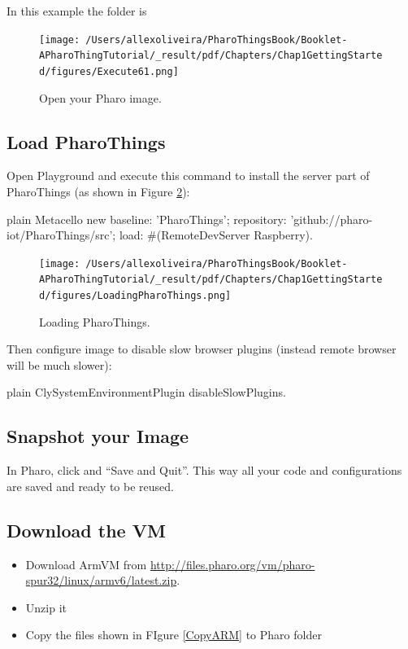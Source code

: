 \documentclass[10pt,twoside,english]{_support/latex/sbabook/sbabook}
\begin{document}
In this example the folder is  


\begin{figure}

\begin{center}
\texttt{[image: /Users/allexoliveira/PharoThingsBook/Booklet-APharoThingTutorial/\_result/pdf/Chapters/Chap1GettingStarted/figures/Execute61.png]}\caption{Open your Pharo image.\label{Execute61}}\end{center}
\end{figure}

\subsection{Load PharoThings}
Open Playground and execute this command to install the server part of PharoThings (as shown in Figure \ref{LoadingPharoThings}):

\begin{displaycode}{plain}
Metacello new
	baseline: 'PharoThings';
	repository: 'github://pharo-iot/PharoThings/src';
	load: #(RemoteDevServer Raspberry).
\end{displaycode}


\begin{figure}

\begin{center}
\texttt{[image: /Users/allexoliveira/PharoThingsBook/Booklet-APharoThingTutorial/\_result/pdf/Chapters/Chap1GettingStarted/figures/LoadingPharoThings.png]}\caption{Loading PharoThings.\label{LoadingPharoThings}}\end{center}
\end{figure}


Then configure image to disable slow browser plugins (instead remote browser will be much slower):

\begin{displaycode}{plain}
ClySystemEnvironmentPlugin disableSlowPlugins.
\end{displaycode}
\subsection{Snapshot your Image}
 In Pharo, click and “Save and Quit”. This way all your code and configurations are saved and ready to be reused.
 
 
\subsection{Download the VM}
\begin{itemize}
\item Download ArmVM from \url{http://files.pharo.org/vm/pharo-spur32/linux/armv6/latest.zip}.
\item Unzip it
\item Copy the files shown in FIgure \ref{CopyARM}  to Pharo folder  
\end{itemize}
\end{document}
